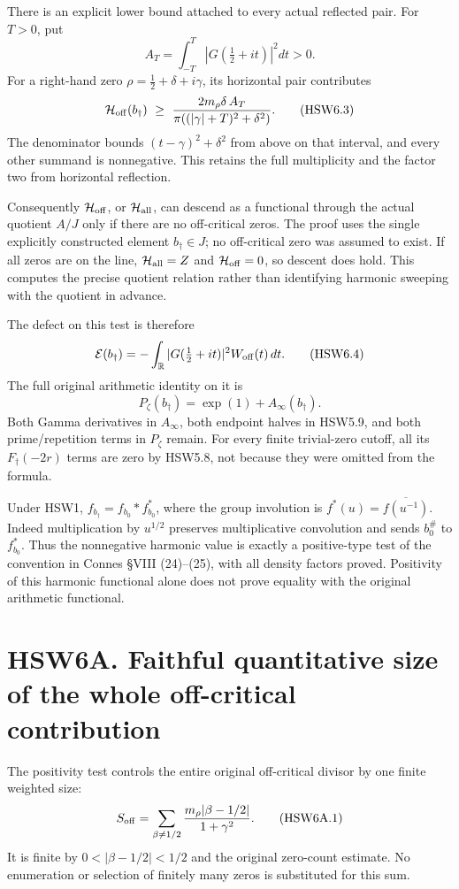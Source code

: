 There is an explicit lower bound attached to every actual reflected
pair. For \(T>0\), put \[
A_T=\int_{-T}^T|G(\tfrac12+it)|^2dt>0.
\] For a right-hand zero \(\rho=\tfrac12+\delta+i\gamma\), its
horizontal pair contributes \[
\mathcal H_{\rm off}(b_\dagger)\ \ge\
\frac{2m_\rho\delta\,A_T}
{\pi((|\gamma|+T)^2+\delta^2)}.
\tag{HSW6.3}
\] The denominator bounds \((t-\gamma)^2+\delta^2\) from above on that
interval, and every other summand is nonnegative. This retains the full
multiplicity and the factor two from horizontal reflection.

Consequently \(\mathcal H_{\rm off}\), or \(\mathcal H_{\rm all}\), can
descend as a functional through the actual quotient \(A/J\) only if
there are no off-critical zeros. The proof uses the single explicitly
constructed element \(b_\dagger\in J\); no off-critical zero was assumed
to exist. If all zeros are on the line, \(\mathcal H_{\rm all}=Z\) and
\(\mathcal H_{\rm off}=0\), so descent does hold. This computes the
precise quotient relation rather than identifying harmonic sweeping with
the quotient in advance.

The defect on this test is therefore \[
\mathcal E(b_\dagger)=
-\int_{\mathbb R}|G(\tfrac12+it)|^2W_{\rm off}(t)\,dt.
\tag{HSW6.4}
\] The full original arithmetic identity on it is \[
P_\zeta(b_\dagger)=\exp(1)+A_\infty(b_\dagger).
\tag{HSW6.5}
\] Both Gamma derivatives in \(A_\infty\), both endpoint halves in
HSW5.9, and both prime/repetition terms in \(P_\zeta\) remain. For every
finite trivial-zero cutoff, all its \(F_\dagger(-2r)\) terms are zero by
HSW5.8, not because they were omitted from the formula.

Under HSW1, \(f_{b_\dagger}=f_{b_0}*f_{b_0}^*\), where the group
involution is \(f^*(u)=\overline{f(u^{-1})}\). Indeed multiplication by
\(u^{1/2}\) preserves multiplicative convolution and sends \(b_0^\#\) to
\(f_{b_0}^*\). Thus the nonnegative harmonic value is exactly a
positive-type test of the convention in Connes §VIII (24)--(25), with
all density factors proved. Positivity of this harmonic functional alone
does not prove equality with the original arithmetic functional.

\section{HSW6A. Faithful quantitative size of the whole off-critical
contribution}\label{hsw6a.-faithful-quantitative-size-of-the-whole-off-critical-contribution}

The positivity test controls the entire original off-critical divisor by
one finite weighted size: \[
S_{\rm off}=\sum_{\beta\ne1/2}
 \frac{m_\rho|\beta-1/2|}{1+\gamma^2}.
\tag{HSW6A.1}
\] It is finite by \(0<|\beta-1/2|<1/2\) and the original zero-count
estimate. No enumeration or selection of finitely many zeros is
substituted for this sum.

